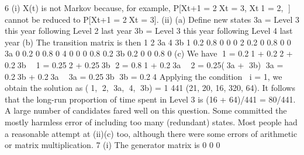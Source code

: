6 (i) {X(t)} is not Markov because, for example, P[Xt+1 = 2Xt = 3, Xt1 = 2, ]
cannot be reduced to P[Xt+1 = 2Xt = 3].
(ii) (a) Define new states
3a = Level 3 this year following Level 2 last year
3b = Level 3 this year following Level 4 last year
(b) The transition matrix is then
1 2 3a 4 3b
1 0.2 0.8 0 0 0
2 0.2 0 0.8 0 0
3a 0 0.2 0 0.8 0
4 0 0 0 0.8 0.2
3b 0.2 0 0 0.8 0
(c) We have
1 = 0.21 + 0.22 + 0.23b  1 = 0.252 + 0.253b
2 = 0.81 + 0.23a  2 = 0.25(3a + 3b)
3a = 0.23b + 0.23a  3a = 0.253b
3b = 0.24
Applying the condition i = 1, we obtain the solution as
(1, 2, 3a, 4, 3b) = 1
441
(21, 20, 16, 320, 64).
It follows that the long-run proportion of time spent in Level 3 is
(16 + 64)/441 = 80/441.
A large number of candidates fared well on this question. Some committed the mostly
harmless error of including too many (redundant) states. Most people had a
reasonable attempt at (ii)(c) too, although there were some errors of arithmetic or
matrix multiplication.
7 (i) The generator matrix is
0 0 0
    
    	 	  
 

